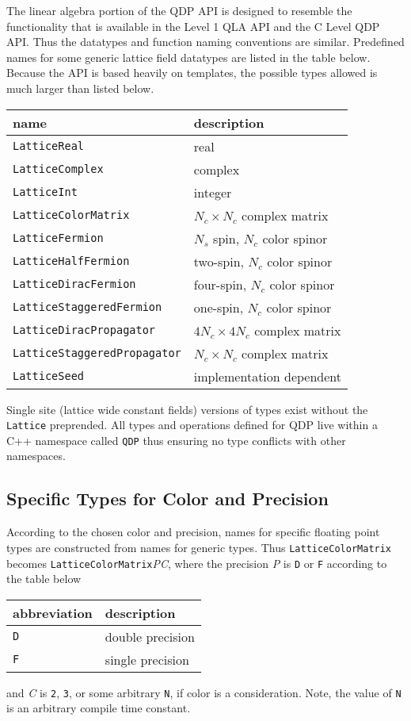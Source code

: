 \documentclass[12pt,letterpaper]{article}
\newcommand{\cpp}{C++}
\newcommand{\tLatticeReal}{LatticeReal}
\newcommand{\tLatticeComplex}{LatticeComplex}
\newcommand{\tLatticeInt}{LatticeInt}
\newcommand{\tLatticeColorMatrix}{LatticeColorMatrix}
\newcommand{\tLatticeFermion}{LatticeFermion}
\newcommand{\tLatticeHalfFermion}{LatticeHalfFermion}
\newcommand{\tLatticeDiracFermion}{LatticeDiracFermion}
\newcommand{\tLatticeStaggeredFermion}{LatticeStaggeredFermion}
\newcommand{\tLatticeDiracPropagator}{LatticeDiracPropagator}
\newcommand{\tLatticeStaggeredPropagator}{LatticeStaggeredPropagator}
\newcommand{\tLatticeRandomState}{LatticeSeed}
\begin{document}
The linear algebra portion of the QDP API is designed to resemble the
functionality that is available in the Level 1 QLA API and the C Level
QDP API.  Thus the datatypes and function naming conventions are
similar.  Predefined names for some generic lattice field datatypes
are listed in the table below. Because the API is based heavily on
templates, the possible types allowed is much larger than listed
below.
\begin{center}
\begin{tabular}{|l|l|}
\hline
name                       & description \\
\hline
{\tt \tLatticeReal               } & real \\
{\tt \tLatticeComplex            } & complex \\
{\tt \tLatticeInt                } & integer \\
{\tt \tLatticeColorMatrix              } & $N_c \times N_c$ complex matrix \\
{\tt \tLatticeFermion            } & $N_s$ spin, $N_c$ color spinor \\
{\tt \tLatticeHalfFermion        } & two-spin, $N_c$ color spinor \\
{\tt \tLatticeDiracFermion       } & four-spin, $N_c$ color spinor \\
{\tt \tLatticeStaggeredFermion   } & one-spin,  $N_c$ color spinor \\
{\tt \tLatticeDiracPropagator    } & $4N_c \times 4N_c$ complex matrix \\
{\tt \tLatticeStaggeredPropagator} & $N_c \times N_c$ complex matrix \\
{\tt \tLatticeRandomState        } & implementation dependent \\
\hline
\end{tabular}
\end{center}
%
Single site (lattice wide constant fields) versions of types exist
without the {\tt Lattice} preprended.  All types and operations
defined for QDP live within a \cpp{} namespace called \verb|QDP| thus
ensuring no type conflicts with other namespaces.

\subsection{Specific Types for Color and Precision}

According to the chosen color and precision, names for specific
floating point types are constructed from names for generic types.
Thus {\tt \tLatticeColorMatrix} becomes {\tt LatticeColorMatrix}{\it PC},
where the precision {\it P} is {\tt D} or {\tt F} according to the
table below
\begin{center}
\begin{tabular}{|l|l|}
\hline
abbreviation & description \\
\hline
{\tt D}            & double precision \\
{\tt F}            & single precision \\
\hline
\end{tabular}
\end{center}
and {\it C} is {\tt 2}, {\tt 3}, or some arbitrary {\tt N}, if color is a
consideration. Note, the value of {\tt N} is an arbitrary compile
time constant.
\end{document}
